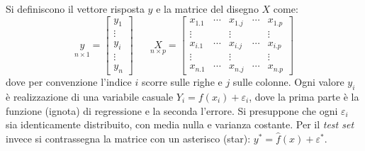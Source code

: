\documentclass[12pt, a4page]{article}
\begin{document}
Si definiscono il vettore risposta $y$ e la matrice del disegno $X$ come:
\begin{equation*}
  \underset{n \times 1}y =
  \begin{bmatrix}
    y_1 \\
    \vdots \\
    y_i \\
    \vdots \\
    y_n
  \end{bmatrix}\hspace{20pt}
  \underset{n \times p}X =
  \begin{bmatrix}
    x_{1.1} & \cdots & x_{1.j} & \cdots & x_{1.p} \\
    \vdots       &  & \vdots &     &   \vdots \\
    x_{i.1} & \cdots & x_{i.j} & \cdots & x_{i.p} \\
    \vdots       &  & \vdots &     &   \vdots \\
    x_{n.1} & \cdots & x_{n.j} & \cdots & x_{n.p}
  \end{bmatrix}
\end{equation*}
dove per convenzione l'indice $i$ scorre sulle righe e $j$ sulle colonne.
Ogni valore $y_i$ è realizzazione di una variabile casuale $Y_i = f(x_i) + \varepsilon_i$, dove la prima parte è la funzione (ignota) di regressione e la seconda l'errore.
Si presuppone che ogni $\varepsilon_i$ sia identicamente distribuito, con media nulla e varianza costante.
Per il \textit{test set} invece si contrassegna la matrice con un asterisco (star): $y^* = \hat{f}(x) + \varepsilon^*$.
\end{document}
